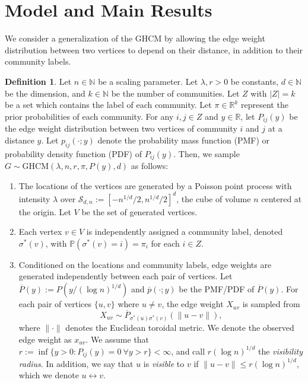 \documentclass{article}
\newcommand{\R}{\mathbb{R}}
\renewcommand{\P}{\mathbb{P}}
\newcommand{\N}{\mathbb{N}}
\newcommand{\1}{\mathbbm{1}}
\newcommand{\calS}{\mathcal{S}}
\newcommand{\visible}{\leftrightarrow{}}
\theoremstyle{definition}
\newtheorem{definition}{Definition}
\theoremstyle{plain}
\begin{document}
\section{Model and Main Results}
\label{sec:model}
We consider a generalization of the GHCM \cite{Gaudio+2025} by allowing the edge weight distribution between two vertices to depend on their distance, in addition to their community labels.

\begin{definition}
Let $n \in \N$ be a scaling parameter. Let $\lambda, r > 0$ be constants, $d \in \N$ be the dimension, and $k \in \N$ be the number of communities. Let $Z$  with $|Z| = k$ be a set which contains the label of each community. Let $\pi \in \R^k$ represent the prior probabilities of each community. For any $i, j \in Z$ and $y \in \R$, let $P_{ij}(y)$ be the edge weight distribution between two vertices of community $i$ and $j$ at a distance $y$. Let $p_{ij}(\cdot ; y)$ denote the probability mass function (PMF) or probability density function (PDF) of $P_{ij}(y)$. Then, we sample $G \sim \text{GHCM}(\lambda, n, r, \pi, P(y), d)$ as follows:
\begin{enumerate}
    \item The locations of the vertices are generated by a Poisson point process with intensity $\lambda$ over $\calS_{d, n} := [-n^{1/d}/2, n^{1/d}/2]^d$, the cube of volume $n$ centered at the origin. Let $V$ be the set of generated vertices.
    
    \item Each vertex $v \in V$ is independently assigned a community label, denoted $\sigma^*(v)$, with $\P(\sigma^*(v) = i) = \pi_i$ for each $i \in Z$.
    
    \item Conditioned on the locations and community labels, edge weights are generated independently between each pair of vertices. Let $\overline{P}(y) := P(y/(\log n)^{1/d})$ and $\overline{p}(\cdot; y)$ be the PMF/PDF of $\overline{P}(y)$. For each pair of vertices $\{u, v\}$ where $u \neq v$, the edge weight $X_{uv}$ is sampled from
    \begin{equation*}
        X_{uv} \sim \overline{P}_{\sigma^*(u)\sigma^*(v) }(\|u-v\|),
    \end{equation*}
    where $\|\cdot\|$ denotes the Euclidean toroidal metric. We denote the observed edge weight as $x_{uv}$. We assume that $r := \inf\{y > 0 : P_{ij}(y) = 0 \: \forall y > r\} < \infty$, and call $r (\log n)^{1/d}$ the \textit{visibility radius}. In addition, we say that $u$ is \textit{visible} to $v$ if $\|u - v\| \leq r (\log n)^{1/d}$, which we denote $u \visible v$. 
\end{enumerate}
\end{definition}
\end{document}
